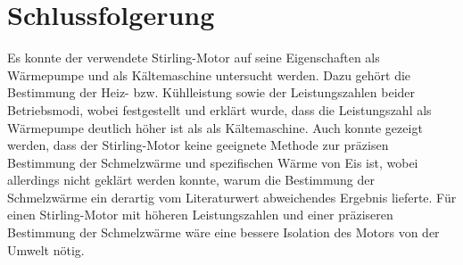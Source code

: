 \documentclass[
	a4paper,
	12pt,
	pagesize,
	ngerman
]{scrartcl}
\begin{document}
	\section{Schlussfolgerung}
	Es konnte der verwendete Stirling-Motor auf seine Eigenschaften als Wärmepumpe und als Kältemaschine untersucht werden.
	Dazu gehört die Bestimmung der Heiz- bzw. Kühlleistung sowie der Leistungszahlen beider Betriebsmodi, wobei festgestellt und erklärt wurde, dass die Leistungszahl als Wärmepumpe deutlich höher ist als als Kältemaschine.
	Auch konnte gezeigt werden, dass der Stirling-Motor keine geeignete Methode zur präzisen Bestimmung der Schmelzwärme und spezifischen Wärme von Eis ist, wobei allerdings nicht geklärt werden konnte, warum die Bestimmung der Schmelzwärme ein derartig vom Literaturwert abweichendes Ergebnis lieferte.
	Für einen Stirling-Motor mit höheren Leistungszahlen und einer präziseren Bestimmung der Schmelzwärme wäre eine bessere Isolation des Motors von der Umwelt nötig.
	\printbibliography
\end{document}
